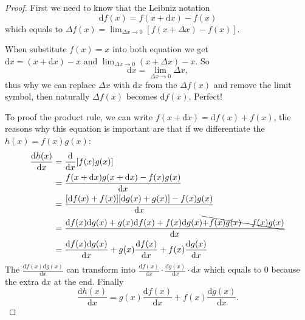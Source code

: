 \begin{proof}
    First we need to know that the Leibniz notation
    $$
    \mathrm{d}f(x)=f(x+\mathrm{d}x)-f(x)
    $$
    which equals to $\Delta f(x)=\lim_{\Delta x\to 0} [f(x+\Delta x)-f(x)]$.

    When substitute $f(x)=x$ into both equation we get $\mathrm{d}x=(x+\mathrm{d}x)-x\text{ and }\lim_{\Delta x\to 0} (x+\Delta x)-x$.
    So
    $$
    \mathrm{d}x=\lim_{\Delta x\to 0} \Delta x,
    $$
    thus why we can replace $\Delta x$ with $\mathrm{d}x$ from the $\Delta f(x)$ and remove the limit symbol, then naturally $\Delta f(x)$ becomes $\mathrm{d}f(x)$, Perfect!

    To proof the product rule, we can write $f(x+\mathrm{d}x)=\mathrm{d}f(x)+f(x)$, the reasons why this equation is important are that if we differentiate the $h(x)=f(x)g(x)$:
    \begin{align*}
        \frac{\mathrm{d}h(x)}{\mathrm{d}x} & =\frac{\mathrm{d}}{\mathrm{d}x}[f(x)g(x)] \\
                                           & =\frac{f(x+\mathrm{d}x)g(x+\mathrm{d}x)-f(x)g(x)}{\mathrm{d}x} \\
                                           & =\frac{[\mathrm{d}f(x)+f(x)][\mathrm{d}g(x)+g(x)]-f(x)g(x)}{\mathrm{d}x} \\
                                           & =\frac{\mathrm{d}f(x)\mathrm{d}g(x)+g(x)\mathrm{d}f(x)+f(x)\mathrm{d}g(x)\bcancel{+f(x)g(x)-f(x)g(x)}}{\mathrm{d}x} \\
                                           & =\frac{\mathrm{d}f(x)\mathrm{d}g(x)}{\mathrm{d}x}+g(x)\frac{\mathrm{d}f(x)}{\mathrm{d}x}+f(x)\frac{\mathrm{d}g(x)}{\mathrm{d}x}
    \end{align*}
    The $\frac{\mathrm{d}f(x)\mathrm{d}g(x)}{\mathrm{d}x}$ can transform into $\frac{\mathrm{d}f(x)}{\mathrm{d}x}\cdot\frac{\mathrm{d}g(x)}{\mathrm{d}x}\cdot\mathrm{d}x$ which equals to $0$ because the extra $\mathrm{d}x$ at the end. Finally
    $$
    \frac{\mathrm{d}h(x)}{\mathrm{d}x}=g(x)\frac{\mathrm{d}f(x)}{\mathrm{d}x}+f(x)\frac{\mathrm{d}g(x)}{\mathrm{d}x}.
    $$
\end{proof}

